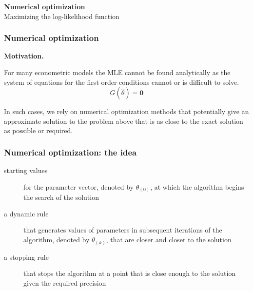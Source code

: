 \documentclass[notes,blackandwhite,mathsans]{beamer}
\begin{document}
{
\begin{frame}

\begin{adjustwidth}{-0.5cm}{0cm}
\vspace{7.3cm}\Large
\textbf{{\color{mcxs1}Numerical optimization}}\\ 
{\color{mcxs5}Maximizing the log-likelihood function}
\end{adjustwidth}

\end{frame}
}




\begin{frame}
\frametitle{Numerical optimization}

\textbf{Motivation.}

{\color{mcxs2}For many econometric models the MLE cannot be found analytically as the system of equations for the first order conditions cannot or is difficult to solve.}
$$ G\left(\hat\theta\right) = \mathbf{0} $$

{\color{mcxs2}In such cases, we rely on numerical optimization methods that potentially give an approximate solution to the problem above that is as close to the exact solution as possible or required.}

\end{frame}





\begin{frame}
\frametitle{Numerical optimization: the idea}



\begin{description}
\item[starting values] {\color{mcxs2}for the parameter vector, denoted by} $\theta_{(0)}${\color{mcxs2}, at which the algorithm begins the search of the solution}
\item[a dynamic rule] {\color{mcxs2}that generates values of parameters in subsequent iterations of the algorithm, denoted by} $\theta_{(k)}${\color{mcxs2}, that are closer and closer to the solution}
\item[a stopping rule] {\color{mcxs2}that stops the algorithm at a point that is close enough to the solution given the required precision}
\end{description}

\end{frame}
\end{document}
